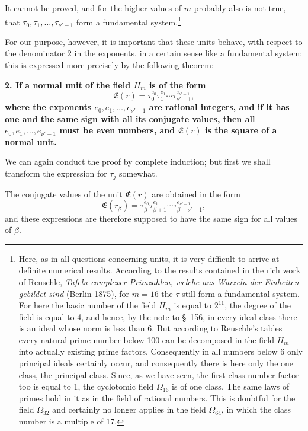 \documentclass[11pt]{article}
\begin{document}
It cannot be proved, and for the higher values of $m$ probably also is not true, that $\tau_0,\tau_1,\ldots,\tau_{\nu'-1}$ form a fundamental system.\footnote{Here, as in all questions concerning units, it is very difficult to arrive at definite numerical results. According to the results contained in the rich work of Reuschle, \emph{Tafeln complexer Primzahlen, welche aus Wurzeln der Einheiten gebildet sind} (Berlin 1875), for $m=16$ the $\tau$ still form a fundamental system. For here the basic number of the field $H_m$ is equal to $2^{11}$, the degree of the field is equal to 4, and hence, by the note to \S~156, in every ideal class there is an ideal whose norm is less than 6. But according to Reuschle's tables every natural prime number below 100 can be decomposed in the field $H_m$ into actually existing prime factors. Consequently in all numbers below 6 only principal ideals certainly occur, and consequently there is here only the one class, the principal class. Since, as we have seen, the first class-number factor too is equal to 1, the cyclotomic field $\Omega_{16}$ is of one class. The same laws of primes hold in it as in the field of rational numbers. This is doubtful for the field $\Omega_{32}$ and certainly no longer applies in the field $\Omega_{64}$, in which the class number is a multiple of 17.}

For our purpose, however, it is important that these units behave, with respect to the denominator 2 in the exponents,
in a certain sense like a fundamental system; this is expressed more precisely by the following theorem:

\begin{center}\textbf{2. If a normal unit of the field $H_m$ is of the form
\[
\mathfrak E(r)=\tau_0^{e_0}\tau_1^{e_1}\cdots\tau_{\nu'-1}^{e_{\nu'-1}},
\]
where the exponents $e_0,e_1,
\ldots,e_{\nu'-1}$ are rational integers, and if it has one and the same sign with all its conjugate values, then all $e_0,e_1,\ldots,e_{\nu'-1}$ must be even numbers, and $\mathfrak E(r)$ is the square of a normal unit.}\end{center}

We can again conduct the proof by complete induction; but first we shall transform the expression for $\tau_j$ somewhat.

The conjugate values of the unit $\mathfrak E(r)$ are obtained in the form
\[
\mathfrak E(r_\beta)=\tau_\beta^{e_0}\tau_{\beta+1}^{e_1}\cdots\tau_{\beta+\nu'-1}^{e_{\nu'-1}},
\]
and these expressions are therefore supposed to have the same sign for all values of $\beta$.
\end{document}

